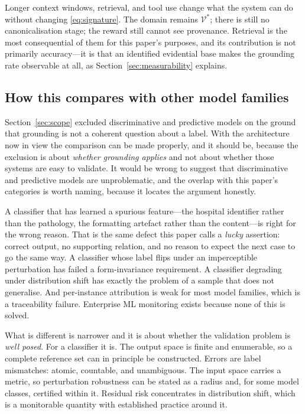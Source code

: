 \documentclass[11pt]{article}
\theoremstyle{plain}
\theoremstyle{definition}
\begin{document}
Longer context windows, retrieval, and tool use change what the system can do without
changing \eqref{eq:signature}. The domain
remains $\mathcal{V}^{*}$; there is still no canonicalisation stage; the reward
still cannot see provenance. Retrieval is the most consequential of them for this
paper's purposes, and its contribution is not primarily accuracy---it is that an
identified evidential base makes the grounding rate observable at all, as
Section~\ref{sec:measurability} explains.

\subsection{How this compares with other model families}
\label{sec:not-easier}

Section~\ref{sec:scope} excluded discriminative and predictive models on the ground
that grounding is not a coherent question about a label. With the architecture now in
view the comparison can be made properly, and it should be, because the exclusion is
about \emph{whether grounding applies} and not about whether those systems are easy to
validate. It would be wrong to suggest that discriminative
and predictive models are unproblematic, and the overlap with this paper's categories
is worth naming, because it locates the argument honestly.

A classifier that has learned a spurious feature---the hospital identifier rather
than the pathology, the formatting artefact rather than the content---is right for
the wrong reason. That is the same defect this paper calls a \emph{lucky} assertion:
correct output, no supporting relation, and no reason to expect the next case to go
the same way. A classifier whose label flips under an imperceptible perturbation has
failed a form-invariance requirement. A classifier degrading under distribution
shift has exactly the problem of a sample that does not generalise. And per-instance
attribution is weak for most model families, which is a traceability failure.
Enterprise ML monitoring exists because none of this is solved.

What is different is narrower and it is about whether the validation problem is
\emph{well posed}. For a classifier it is. The output space is finite and
enumerable, so a complete reference set can in principle be constructed. Errors are
label mismatches: atomic, countable, and unambiguous. The input space carries a
metric, so perturbation robustness can be stated as a radius and, for some model
classes, certified within it. Residual risk concentrates in distribution shift,
which is a monitorable quantity with established practice around it.
\end{document}
